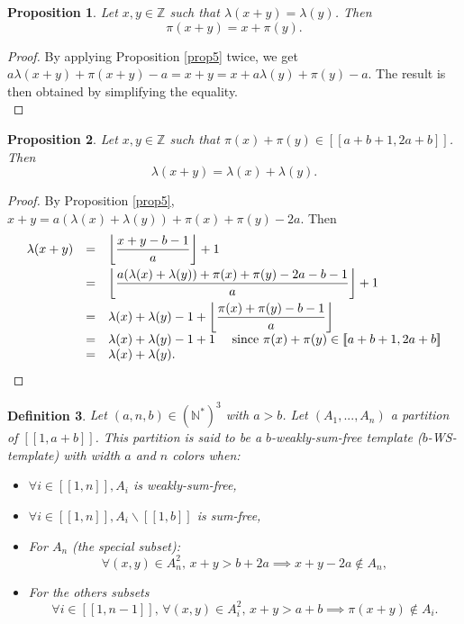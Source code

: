 \documentclass{article}
\newtheorem{definition}{Definition}[section]
\newtheorem{computational theorem}[definition]{Computational Theorem}
\newtheorem{proposition}[definition]{Proposition}
\begin{document}
\begin{proposition}
\label{prop6}
Let \(x, y \in \mathbb{Z}\) such that \(\lambda(x + y) = \lambda(y)\). Then
\[
\pi(x + y) = x + \pi(y).
\]
\end{proposition}

\begin{proof}
By applying Proposition \ref{prop5} twice, we get \(a \lambda(x + y) + \pi(x + y) - a = x + y = x + a \lambda(y) + \pi(y) - a\).
The result is then obtained by simplifying the equality. \\
\end{proof}

\begin{proposition}
\label{prop7}
Let \(x, y \in \mathbb{Z}\) such that \(\pi(x) + \pi(y) \in [\![a + b + 1, 2 a + b]\!]\). Then
\[
\lambda(x + y) = \lambda(x) + \lambda(y).
\]
\end{proposition}

\begin{proof}
By Proposition \ref{prop5}, \(x + y = a (\lambda(x) + \lambda(y)) + \pi(x) + \pi(y) - 2 a\). Then
\[
\begin{array}{l l l}
	\lambda(x + y) & = & \left \lfloor \dfrac{x + y - b - 1}{a} \right \rfloor + 1 \vspace{1mm} \\
	 & = & \left \lfloor \dfrac{a (\lambda(x) + \lambda(y)) + \pi(x) + \pi(y) - 2 a - b - 1}{a} \right \rfloor + 1 \vspace{1mm} \\
	 & = & \lambda(x) + \lambda(y) - 1 + \left \lfloor \dfrac{\pi(x) + \pi(y) - b - 1}{a}\right\rfloor \\
	 & = & \lambda(x)+\lambda(y) -1 +1 ~~~~\text{since } \pi(x) + \pi(y) \in [\![a + b + 1, 2 a + b]\!] \\
	 & =& \lambda(x)+\lambda(y).
\end{array}
\]
\end{proof}

\begin{definition}
Let \( (a,n,b) \in (\mathbb{N}^*)^3\) with \(a > b\). Let \((A_1,...,A_n)\) a partition of  \([\![1, a + b]\!]\).
This partition is said to be a \(b\)-weakly-sum-free template (\(b\)-WS-template) with width \(a\) and \(n\) colors when:

\begin{itemize}
\item \(\forall i \in [\![1, n]\!], A_i\) is weakly-sum-free,
\item \(\forall i \in [\![1, n]\!], A_i\backslash [\![1, b]\!]\) is sum-free,
\item For \(A_n\) (the special subset):
	\[
	\forall (x,y) \in A_n^2, \,x+y>b+2a \implies x+y-2a\notin A_n,
	\]
\item For the others subsets
	\[
	\forall i \in [\![1,n-1]\!], \, \forall(x,y) \in A_i^2, \, x+y>a+b \implies \pi(x+y) \notin A_i.
	\]
\end{itemize}
\end{definition}
\end{document}
